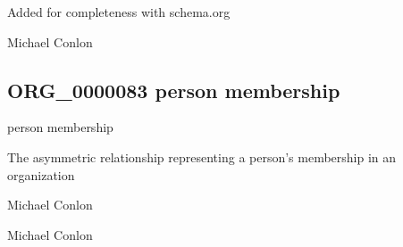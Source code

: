\documentclass[letterpaper,10pt,english]{sphinxmanual}
\begin{document}
\begin{sphinxShadowBox}

\sphinxAtStartPar
Added for completeness with schema.org
\end{sphinxShadowBox}

\begin{sphinxShadowBox}

\sphinxAtStartPar
Michael Conlon 
\end{sphinxShadowBox}
\begin{quote}

\ignorespaces \end{quote}


\subsection{ORG\_0000083 \sphinxhyphen{} person membership}
\label{\detokenize{doc-ORG_0000083:org-0000083-person-membership}}\label{\detokenize{doc-ORG_0000083:index-0}}\label{\detokenize{doc-ORG_0000083::doc}}
\begin{sphinxShadowBox}

\sphinxAtStartPar
person membership
\end{sphinxShadowBox}

\begin{sphinxShadowBox}

\sphinxAtStartPar
The asymmetric relationship representing a person’s membership in an organization
\end{sphinxShadowBox}

\begin{sphinxShadowBox}

\sphinxAtStartPar
Michael Conlon 
\end{sphinxShadowBox}

\begin{sphinxShadowBox}

\sphinxAtStartPar
Michael Conlon 
\end{sphinxShadowBox}
\begin{quote}

\ignorespaces \end{quote}
\end{document}
